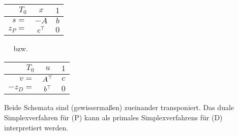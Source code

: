 \begin{center}
	\begin{tabular}{r|c|c}
		$T_0$ & $x$ & $1$ \\ \hline
		$s = $ & $-A$ & $b$ \\ \hline
		$z_P =$ & $c^{\top}$ & $0$
	\end{tabular}
    $\quad$ bzw. $\quad$
	\begin{tabular}{r|c|c}
		$T_0$ & $u$ & $1$ \\ \hline
		$v = $ & $A^{\top}$ & $c$ \\ \hline
		$- z_D =$ & $b^{\top}$ & $0$
	\end{tabular}
\end{center}

Beide Schemata sind (gewissermaßen) zueinander transponiert.
Das duale Simplexverfahren für (P) kann als primales Simplexverfahrens für (D) interpretiert werden.